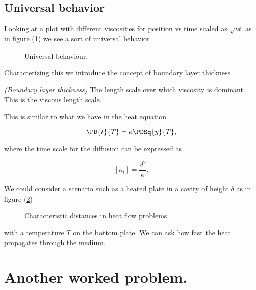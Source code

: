 \subsection{Universal behavior}

Looking at a plot with different viscosities for position vs time scaled as $\sqrt{\nu t}$ as in figure (\ref{fig:continuumL17:continuumL17Fig4}) we see a sort of universal behavior

\begin{figure}[htp]
   \centering
   \def\svgwidth{0.6\columnwidth}
   
   \caption{Universal behaviour.}\label{fig:continuumL17:continuumL17Fig4}
\end{figure}

Characterizing this we introduce the concept of boundary layer thickness

\begin{definition}
\emph{(Boundary layer thickness)}
\label{dfn:continuumL17:200}
The length scale over which viscosity is dominant.  This is the viscous length scale.
\end{definition}

This is similar to what we have in the heat equation 

\begin{equation}\label{eqn:continuumL17:220}
\PD{t}{T} = \kappa \PDSq{y}{T},
\end{equation}

where the time scale for the diffusion can be expressed as

\begin{equation}\label{eqn:continuumL17:240}
[\kappa_t] = \frac{d^2}{\kappa}.
\end{equation}

We could consider a scenario such as a heated plate in a cavity of height $\delta$ as in figure (\ref{fig:continuumL17:continuumL17Fig5})
\begin{figure}[htp]
   \centering
   \def\svgwidth{0.5\columnwidth}
   
   \caption{Characteristic distances in heat flow problems.}\label{fig:continuumL17:continuumL17Fig5}
\end{figure}

with a temperature $T$ on the bottom plate.  We can ask how fast the heat propagates through the medium.

\section{Another worked problem.}

